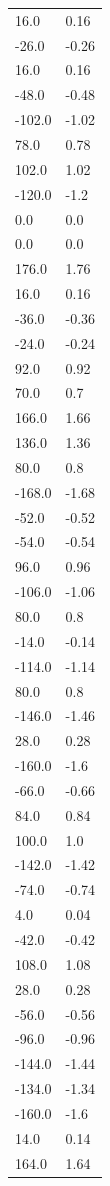 \begin{longtable}{ll}
16.0 & 0.16 \\
-26.0 & -0.26 \\
16.0 & 0.16 \\
-48.0 & -0.48 \\
-102.0 & -1.02 \\
78.0 & 0.78 \\
102.0 & 1.02 \\
-120.0 & -1.2 \\
0.0 & 0.0 \\
0.0 & 0.0 \\
176.0 & 1.76 \\
16.0 & 0.16 \\
-36.0 & -0.36 \\
-24.0 & -0.24 \\
92.0 & 0.92 \\
70.0 & 0.7 \\
166.0 & 1.66 \\
136.0 & 1.36 \\
80.0 & 0.8 \\
-168.0 & -1.68 \\
-52.0 & -0.52 \\
-54.0 & -0.54 \\
96.0 & 0.96 \\
-106.0 & -1.06 \\
80.0 & 0.8 \\
-14.0 & -0.14 \\
-114.0 & -1.14 \\
80.0 & 0.8 \\
-146.0 & -1.46 \\
28.0 & 0.28 \\
-160.0 & -1.6 \\
-66.0 & -0.66 \\
84.0 & 0.84 \\
100.0 & 1.0 \\
-142.0 & -1.42 \\
-74.0 & -0.74 \\
4.0 & 0.04 \\
-42.0 & -0.42 \\
108.0 & 1.08 \\
28.0 & 0.28 \\
-56.0 & -0.56 \\
-96.0 & -0.96 \\
-144.0 & -1.44 \\
-134.0 & -1.34 \\
-160.0 & -1.6 \\
14.0 & 0.14 \\
164.0 & 1.64 \\

\end{longtable}
